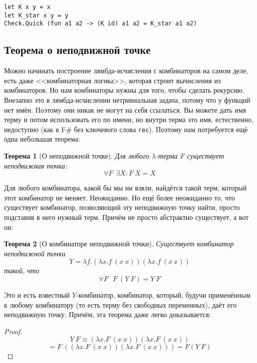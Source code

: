 \documentclass[a5paper]{article}
\newtheorem{rustheorem}{Теорема}
\begin{document}
\begin{verbatim}
let K x y = x
let K_star x y = y
Check.Quick (fun a1 a2 -> (K id) a1 a2 = K_star a1 a2)
\end{verbatim}

\subsection{Теорема о неподвижной точке}

Можно начинать построение лямбда-исчисления с комбинаторов на самом деле, есть даже <<комбинаторная логика>>, которая строит вычисления из комбинаторов. Но нам комбинаторы нужны для того, чтобы сделать рекурсию. Внезапно это в лямбда-исчислении нетривиальная задача, потому что у функций нет имён. Поэтому они никак не могут на себя ссылаться. Вы можете дать имя терму и потом использовать его по имени, но внутри терма это имя, естественно, недоступно (как в F\# без ключевого слова \texttt{rec}). Поэтому нам потребуется ещё одна небольшая теорема:

\begin{rustheorem}[О неподвижной точке]
    Для любого $\lambda$-терма $F$ существует неподвижная точка:
    $$\forall F\ \ \exists X : F\ X = X$$
\end{rustheorem}

Для любого комбинатора, какой бы мы ни взяли, найдётся такой терм, который этот комбинатор не меняет. Неожиданно. Но ещё более неожиданно то, что существует комбинатор, позволяющий эту неподвижную точку найти, просто подставив в него нужный терм. Причём не просто абстрактно существует, а вот он:

\begin{rustheorem}[О комбинаторе неподвижной точки]
    Существует комбинатор неподвижной точки
    $$Y = \lambda f.(\lambda x.f\ (x\ x)) (\lambda x.f\ (x\ x))$$
    такой, что 
    $$\forall F\ \ \ F\ (Y\ F) = Y\ F$$
\end{rustheorem}

Это и есть известный $Y$-комбинатор, комбинатор, который, будучи применённым к любому комбинатору (то есть терму без свободных переменных), даёт его неподвижную точку. Причём, эта теорема даже легко доказывается:

\begin{proof}
    $$Y\ F \equiv (\lambda x.F\ (x\ x))(\lambda x.F\ (x\ x))$$
    $$    = F\ ((\lambda x.F\ (x\ x))(\lambda x.F\ (x\ x))) = F(Y\ F)$$
\end{proof}
\end{document}

